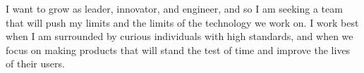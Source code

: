 
I want to grow as leader, innovator, and engineer, and so I am seeking a team that will push my limits and the limits of the technology we work on. I work best when I am surrounded by curious individuals with high standards, and when we focus on making products that will stand the test of time and improve the lives of their users.